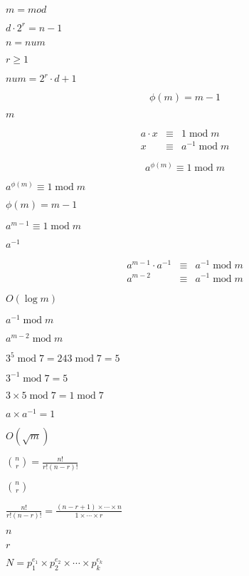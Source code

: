 \documentclass{article}
\begin{document}
$m = mod
$
\pagebreak

$d \cdot 2^r = n - 1$
\pagebreak

$n = num$
\pagebreak

$r \geq 1$
\pagebreak

$num = 2^r \cdot d + 1$
\pagebreak

\[ϕ(m) = m-1\]
\pagebreak

$m$
\pagebreak

\begin{eqnarray*}
  a \cdot x &≡& 1 \;\text{mod}\; m\\
  x &≡& a^{-1} \;\text{mod}\; m
 \end{eqnarray*}
\pagebreak

\[
 a^{ϕ(m)} ≡ 1 \;\text{mod}\; m
 \]
\pagebreak

$a^{ϕ(m)} ≡ 1 \;\text{mod}\; m$
\pagebreak

$ϕ(m) = m-1$
\pagebreak

$a^{m-1} ≡ 1 \;\text{mod}\; m$
\pagebreak

$a^{-1}$
\pagebreak

\begin{eqnarray*}
 a^{m-1} \cdot a^{-1} &≡& a^{-1} \;\text{mod}\; m\\
 a^{m-2} &≡&  a^{-1} \;\text{mod}\; m
 \end{eqnarray*}
\pagebreak

$O(\log m)$
\pagebreak

$a^{-1} \;\text{mod}\; m$
\pagebreak

$a^{m-2} \;\text{mod}\; m$
\pagebreak

$3^5 \;\text{mod}\; 7 = 243 \;\text{mod}\; 7 = 5$
\pagebreak

$3^{-1} \;\text{mod}\; 7 = 5$
\pagebreak

$3 \times 5  \;\text{mod}\; 7 = 1 \;\text{mod}\; 7$
\pagebreak

$a\times a^{-1} = 1$
\pagebreak

$O(\sqrt{m})$
\pagebreak

$ \binom{n}{r} = \frac{n!}{r! (n-r)!} $
\pagebreak

$ \binom{n}{r} $
\pagebreak

$ \frac{n!}{r! (n-r)!} = \frac{(n - r + 1) \times \cdots \times n}{1 \times
\cdots \times r} $
\pagebreak

$ n $
\pagebreak

$ r $
\pagebreak

$N = p_1^{e_1} \times p_2^{e_2} \times\cdots\times p_k^{e_k}$
\pagebreak
\end{document}
